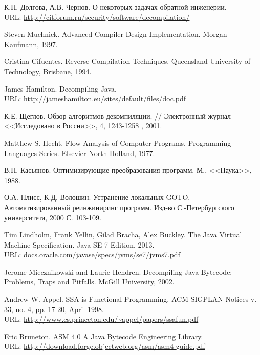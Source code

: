 \begin{thebibliography}{11}

К.Н. Долгова, А.В. Чернов. 
О некоторых задачах обратной инженерии. \\
URL: \url{http://citforum.ru/security/software/decompilation/}

Steven Muchnick. 
Advanced Compiler Design Implementation.
Morgan Kaufmann, 1997.

Cristina Cifuentes.
Reverse Compilation Techniques.
Queensland University of Technology, Brisbane, 1994.

James Hamilton.
Decompiling Java. \\
URL: \url{http://jameshamilton.eu/sites/default/files/doc.pdf}

К.Е. Щеглов.  
Обзор алгоритмов декомпиляции. // Электронный журнал <<Исследовано в России>>, 4, 1243-1258 , 2001. 

Matthew S. Hecht. Flow Analysis of Computer Programs. Programming Languages Series. Elsevier North-Holland,
1977.

В.П. Касьянов. 
Оптимизирующие преобразования программ. М., <<Наука>>, 1988.

О.А. Плисс, К.Д. Волошин.
Устранение локальных GOTO. \\
Автоматизированный реинжиниринг программ.
Изд-во С.-Петербургского университета, 2000 С. 103-109.

Tim Lindholm, Frank Yellin, Gilad Bracha, Alex Buckley.
The Java Virtual Machine Specification.
Java SE 7 Edition, 2013. \\
URL: \url{docs.oracle.com/javase/specs/jvms/se7/jvms7.pdf}

Jerome Miecznikowski and Laurie Hendren. 
Decompiling Java Bytecode: Problems, Traps and Pitfalls. 
McGill University, 2002.

Andrew W. Appel.
SSA is Functional Programming.
ACM SIGPLAN Notices v. 33, no. 4, pp. 17-20, April 1998. \\
URL: \url{http://www.cs.princeton.edu/~appel/papers/ssafun.pdf}

Eric Bruneton.
ASM 4.0 A Java Bytecode Engineering Library. \\
URL: \url{http://download.forge.objectweb.org/asm/asm4-guide.pdf}

\end{thebibliography}
